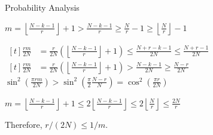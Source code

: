 \documentclass{beamer}
\renewcommand{\:}{\text{ }}
\begin{document}
    \begin{frame}{Probability Analysis}
        \centerline{}
        \begin{exampleblock}{}
            \small \centering
            $\displaystyle m=\left\lfloor \frac{N-k-1}{r} \right\rfloor + 1 > \frac{N-k-1}{r} \geq \frac{N}{r}-1 \geq \left\lfloor \frac{N}{r} \right\rfloor - 1$
        \end{exampleblock}
        \begin{exampleblock}{}
            \small \centering
            $\begin{aligned}[t]
                \frac{rm}{2N} &= \frac{r}{2N} \left( \left\lfloor \frac{N-k-1}{r} \right\rfloor + 1 \right) \leq \frac{N+r-k-1}{2N} \leq \frac{N+r-1}{2N}
            \end{aligned}$ \vspace*{.5em}
            $\begin{aligned}[t]
                \frac{rm}{2N} &= \frac{r}{2N} \left( \left\lfloor \frac{N-k-1}{r} \right\rfloor + 1 \right) > \frac{N-k-1}{2N} \geq \frac{N-r}{2N}
            \end{aligned}$ \vspace*{.5em}
            $\displaystyle \sin^2\left( \frac{\pi rm}{2N} \right) > \sin^2 \left( \frac{\pi}{2} \frac{N-r}{N} \right) = \cos^2 \left( \frac{\pi r}{2N} \right)$
        \end{exampleblock}
        \begin{exampleblock}{}
            \small
            \centerline{$\displaystyle m = \left\lfloor \frac{N-k-1}{r} \right\rfloor + 1 \leq 2 \left\lfloor \frac{N-k-1}{r} \right\rfloor \leq 2 \left\lfloor \frac{N}{r} \right\rfloor \leq \frac{2N}{r}$} \vspace*{.5em}
            Therefore, $r/(2N) \leq 1/m$.
        \end{exampleblock}
    \end{frame}
\end{document}

